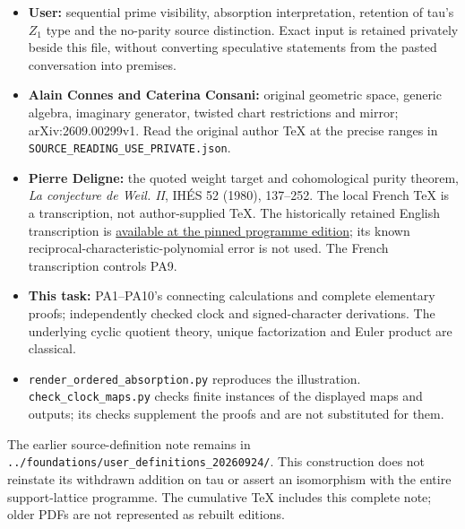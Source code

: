\begin{itemize}

\item
  \textbf{User:} sequential prime visibility, absorption interpretation, retention of tau's \(Z_1\) type and the no-parity source distinction. Exact input is retained privately beside this file, without converting speculative statements from the pasted conversation into premises.
\item
  \textbf{Alain Connes and Caterina Consani:} original geometric space, generic algebra, imaginary generator, twisted chart restrictions and mirror; arXiv:2609.00299v1. Read the original author TeX at the precise ranges in \nolinkurl{SOURCE_READING_USE_PRIVATE.json}.
\item
  \textbf{Pierre Deligne:} the quoted weight target and cohomological purity theorem, \emph{La conjecture de Weil. II}, IHÉS 52 (1980), 137--252. The local French TeX is a transcription, not author-supplied TeX. The historically retained English transcription is \href{https://github.com/KokunoYumeto/zeta-function-research-reader/blob/492a44c2938cc6f5e3c41105567492a8fa528c8c/workbenches/splitzero-tandem/continuations/20260919-observation-responses-first-allocation/prior_intakes/supporting_sources/D032_FULL_EN.tex}{available at the pinned programme edition}; its known reciprocal-characteristic-polynomial error is not used. The French transcription controls PA9.
\item
  \textbf{This task:} PA1--PA10's connecting calculations and complete elementary proofs; independently checked clock and signed-character derivations. The underlying cyclic quotient theory, unique factorization and Euler product are classical.
\item
  \nolinkurl{render_ordered_absorption.py} reproduces the illustration. \nolinkurl{check_clock_maps.py} checks finite instances of the displayed maps and outputs; its checks supplement the proofs and are not substituted for them.
\end{itemize}

The earlier source-definition note remains in \texttt{../foundations/user\_definitions\_20260924/}. This construction does not reinstate its withdrawn addition on tau or assert an isomorphism with the entire support-lattice programme. The cumulative TeX includes this complete note; older PDFs are not represented as rebuilt editions.
